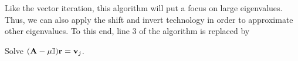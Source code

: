 \begin{remark}
  Like the vector iteration, this algorithm will put a focus on large
  eigenvalues. Thus, we can also apply the shift and invert technology
  in order to approximate other eigenvalues. To this end, line 3 of
  the algorithm is replaced by
  \begin{algorithmic}
    \State Solve $(\mathbf A-\mu\mathbb I)\mathbf r = \mathbf v_j$.
  \end{algorithmic}
\end{remark}



